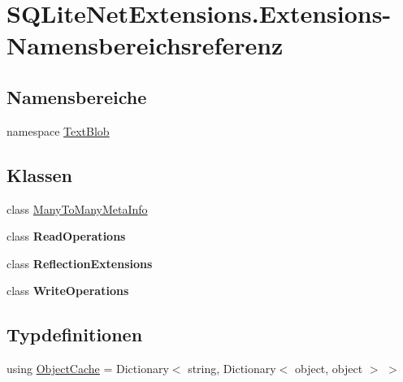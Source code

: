 \hypertarget{namespace_s_q_lite_net_extensions_1_1_extensions}{}\section{S\+Q\+Lite\+Net\+Extensions.\+Extensions-\/\+Namensbereichsreferenz}
\label{namespace_s_q_lite_net_extensions_1_1_extensions}
\subsection*{Namensbereiche}
\begin{DoxyCompactItemize}
\item 
namespace \mbox{\hyperlink{namespace_s_q_lite_net_extensions_1_1_extensions_1_1_text_blob}{Text\+Blob}}
\end{DoxyCompactItemize}
\subsection*{Klassen}
\begin{DoxyCompactItemize}
\item 
class \mbox{\hyperlink{class_s_q_lite_net_extensions_1_1_extensions_1_1_many_to_many_meta_info}{Many\+To\+Many\+Meta\+Info}}
\item 
class {\bfseries Read\+Operations}
\item 
class {\bfseries Reflection\+Extensions}
\item 
class {\bfseries Write\+Operations}
\end{DoxyCompactItemize}
\subsection*{Typdefinitionen}
\begin{DoxyCompactItemize}
\item 
using \mbox{\hyperlink{namespace_s_q_lite_net_extensions_1_1_extensions_a0d74ade80ea1c5d2d5e7d9caa003bf00}{Object\+Cache}} = Dictionary$<$ string, Dictionary$<$ object, object $>$ $>$
\end{DoxyCompactItemize}
